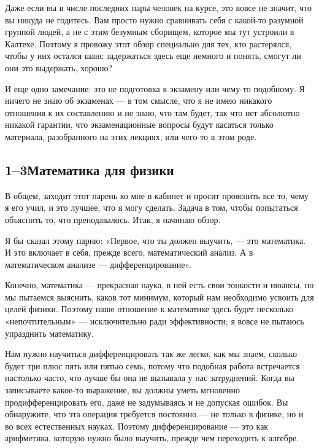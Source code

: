 \documentclass[11pt,oneside]{article}
\begin{document}
Даже если вы в числе последних пары человек на курсе, это вовсе не значит, что вы никуда не годитесь. Вам просто нужно сравнивать себя с какой-то разумной группой людей, а не с этим безумным сборищем, которое мы тут устроили в Калтехе. Поэтому я провожу этот обзор специально для тех, кто растерялся, чтобы у них остался шанс задержаться здесь еще немного и понять, смогут ли они это выдержать, хорошо?\par

И еще одно замечание: это не подготовка к экзамену или чему-то подобному. Я ничего не знаю об экзаменах --- в том смысле, что я не имею никакого отношения к их составлению и не знаю, что там будет, так что нет абсолютно никакой гарантии, что экзаменационные вопросы будут касаться только материала, разобранного на этих лекциях, или чего-то в этом роде.\par

\subsection*{1--3Математика для физики}

В общем, заходит этот парень ко мне в кабинет и просит прояснить все то, чему я его учил, и это лучшее, что я могу сделать. Задача в том, чтобы попытаться объяснить то, что преподавалось. Итак, я начинаю обзор.\par

Я бы сказал этому парню: «Первое, что ты должен выучить, --- это математика. И это включает в себя, прежде всего, математический анализ. А в математическом анализе --- дифференцирование».\par

Конечно, математика --- прекрасная наука, в ней есть свои тонкости и нюансы, но мы пытаемся выяснить, каков тот минимум, который нам необходимо усвоить для целей физики. Поэтому наше отношение к математике здесь будет несколько «непочтительным» --- исключительно ради эффективности; я вовсе не пытаюсь упразднить математику.\par

Нам нужно научиться дифференцировать так же легко, как мы знаем, сколько будет три плюс пять или пятью семь, потому что подобная работа встречается настолько часто, что лучше бы она не вызывала у нас затруднений. Когда вы записываете какое-то выражение, вы должны уметь мгновенно продифференцировать его, даже не задумываясь и не допуская ошибок. Вы обнаружите, что эта операция требуется постоянно --- не только в физике, но и во всех естественных науках. Поэтому дифференцирование --- это как арифметика, которую нужно было выучить, прежде чем переходить к алгебре.\par
\end{document}
